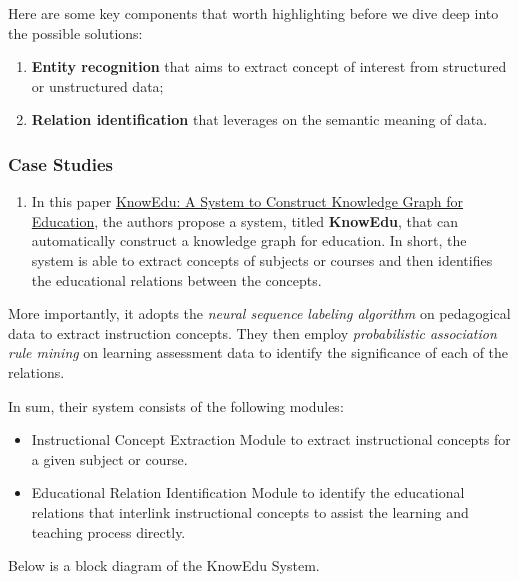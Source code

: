 \documentclass{acm_proc_article-sp}
\providecommand{\tightlist}{%
  \setlength{\itemsep}{0pt}\setlength{\parskip}{0pt}}
\begin{document}
Here are some key components that worth highlighting before we dive deep
into the possible solutions:

\begin{enumerate}
\def\labelenumi{\arabic{enumi}.}
\item
  \textbf{Entity recognition} that aims to extract concept of interest
  from structured or unstructured data;
\item
  \textbf{Relation identification} that leverages on the semantic
  meaning of data.
\end{enumerate}

\subsubsection{Case Studies}\label{case-studies-4}

\begin{enumerate}
\def\labelenumi{\arabic{enumi}.}
\tightlist
\item
  In this paper
  \href{https://ieeexplore.ieee.org/document/8362657}{KnowEdu: A System
  to Construct Knowledge Graph for Education}, the authors propose a
  system, titled \textbf{KnowEdu}, that can automatically construct a
  knowledge graph for education. In short, the system is able to extract
  concepts of subjects or courses and then identifies the educational
  relations between the concepts.
\end{enumerate}

More importantly, it adopts the \emph{neural sequence labeling
algorithm} on pedagogical data to extract instruction concepts. They
then employ \emph{probabilistic association rule mining} on learning
assessment data to identify the significance of each of the relations.

In sum, their system consists of the following modules:

\begin{itemize}
\item
  Instructional Concept Extraction Module to extract instructional
  concepts for a given subject or course.
\item
  Educational Relation Identification Module to identify the educational
  relations that interlink instructional concepts to assist the learning
  and teaching process directly.
\end{itemize}

Below is a block diagram of the KnowEdu System.
\end{document}
